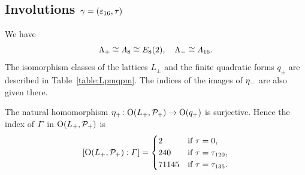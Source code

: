 \documentclass{amsart} %
\begin{document}
\subsection{Involutions $\gamma=(\varepsilon_{16}, \tau)$}\label{subsec:walls16}
%
%
%
%
%
%
%
We have 
\[
\Lambda_{+}\cong\varLambda_{8}\cong E_8(2), \quad \Lambda_{-}\cong \varLambda_{16}.
\]
%
The isomorphism classes of the lattices $L_{\pm}$ and 
the finite quadratic forms $q_{\pm}$ are described in Table~\ref{table:Lpmqpm}.
The indices of the images of ${\eta}_{-}$ are also given there.
%
\begin{proposition}\label{prop:etaplussurj16}
The natural homomorphism ${\eta}_{+}\colon \mathord{\mathrm{O}}(L_{+}, \mathord{\mathcal{P}}_{+})\to \mathord{\mathrm{O}}(q_{+})$ is surjective.
Hence the index of $\varGamma$ in $\mathord{\mathrm{O}}(L_{+}, \mathord{\mathcal{P}}_{+})$ is
\[
[\mathord{\mathrm{O}}(L_{+}, \mathord{\mathcal{P}}_{+}): \varGamma]=
\begin{cases}
2 & \textrm{if $\tau=0$}, \\
240 & \textrm{if $\tau= \tau_{120}$}, \\
71145 & \textrm{if $\tau= \tau_{135}$}.
\end{cases}
\]
\end{proposition}
%
\end{document}
